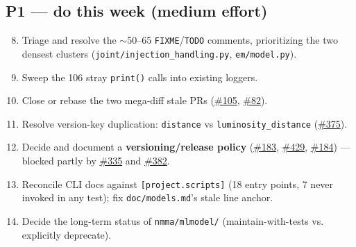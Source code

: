 \documentclass[10pt]{article}
\newcommand{\code}[1]{\texttt{#1}}
\begin{document}
\subsection*{P1 --- do this week (medium effort)}
\begin{enumerate}
\setcounter{enumi}{7}
\item Triage and resolve the $\sim$50--65 \code{FIXME}/\code{TODO} comments,
  prioritizing the two densest clusters (\code{joint/injection\_handling.py},
  \code{em/model.py}).
\item Sweep the 106 stray \code{print()} calls into existing loggers.
\item Close or rebase the two mega-diff stale PRs (\href{https://github.com/nuclear-multimessenger-astronomy/nmma/issues/105}{\#105}, \href{https://github.com/nuclear-multimessenger-astronomy/nmma/issues/82}{\#82}).
\item Resolve version-key duplication: \code{distance} vs
  \code{luminosity\_distance} (\href{https://github.com/nuclear-multimessenger-astronomy/nmma/issues/375}{\#375}).
\item Decide and document a \textbf{versioning/release policy} (\href{https://github.com/nuclear-multimessenger-astronomy/nmma/issues/183}{\#183}, \href{https://github.com/nuclear-multimessenger-astronomy/nmma/issues/429}{\#429},
  \href{https://github.com/nuclear-multimessenger-astronomy/nmma/issues/184}{\#184}) --- blocked partly by \href{https://github.com/nuclear-multimessenger-astronomy/nmma/issues/335}{\#335} and \href{https://github.com/nuclear-multimessenger-astronomy/nmma/issues/382}{\#382}.
\item Reconcile CLI docs against \code{[project.scripts]} (18 entry points, 7
  never invoked in any test); fix \code{doc/models.md}'s stale line anchor.
\item Decide the long-term status of \code{nmma/mlmodel/} (maintain-with-tests vs.
  explicitly deprecate).
\end{enumerate}
\end{document}
